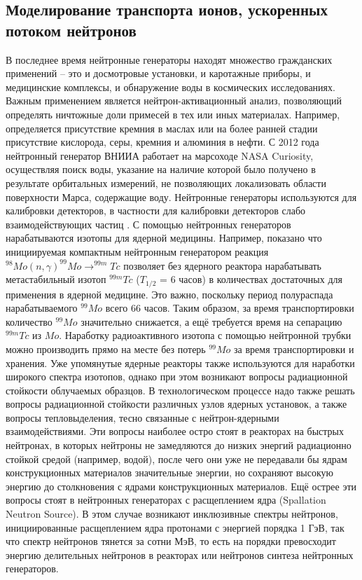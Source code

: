 \documentclass[a4paper,12pt]{article}
\begin{document}
\begin{large}
  
  
  
  
  



   
   
   
\clearpage
\section{Моделирование транспорта ионов, ускоренных потоком нейтронов}
\label{Sol}

   В последнее время нейтронные генераторы находят множество гражданских применений -- это и досмотровые установки, и каротажные приборы, и медицинские комплексы, и обнаружение воды в космических исследованиях.
   Важным применением является нейтрон-активационный анализ, позволяющий определять ничтожные доли примесей в тех или иных материалах.
   Например, определяется присутствие кремния в маслах или на более ранней стадии присутствие кислорода, серы, кремния и алюминия в нефти.
   С 2012 года нейтронный генератор ВНИИА работает на марсоходе NASA Curiosity, осуществляя поиск воды, указание на наличие которой было получено в результате орбитальных измерений, не позволяющих локализовать области поверхности Марса, содержащие воду.
   Нейтронные генераторы используются для калибровки детекторов, в частности для калибровки детекторов слабо взаимодействующих частиц \cite{Calibr}.
   С помощью нейтронных генераторов нарабатываются изотопы для ядерной медицины.
   Например, показано что инициируемая компактным нейтронным генератором реакция $^{98}Mo(n,\gamma)^{99}Mo\rightarrow^{99m}Tc$ позволяет без ядерного реактора нарабатывать метастабильный изотоп $^{99m}Tc$ ($T_{1/2}$ = 6 часов) в количествах достаточных для применения в ядерной медицине.
   Это важно, поскольку период полураспада нарабатываемого $^{99}Mo$ всего 66 часов.
   Таким образом, за время транспортировки количество $^{99}Mo$ значительно снижается, а ещё требуется время на сепарацию $^{99m}Tc$ из $Mo$.
   Наработку радиоактивного изотопа с помощью нейтронной трубки можно производить прямо на месте без потерь $^{99}Mo$ за время транспортировки и хранения.
   Уже упомянутые ядерные реакторы также используются для наработки широкого спектра изотопов, однако при этом возникают вопросы радиационной стойкости облучаемых образцов.
   В технологическом процессе надо также решать вопросы радиационной стойкости различных узлов ядерных установок, а также вопросы тепловыделения, тесно связанные с нейтрон-ядерными взаимодействиями.
   Эти вопросы наиболее остро стоят в реакторах на быстрых нейтронах, в которых нейтроны не замедляются до низких энергий радиационно стойкой средой (например, водой), после чего они уже не передавали бы ядрам конструкционных материалов значительные энергии, но сохраняют высокую энергию до столкновения с ядрами конструкционных материалов.
   Ещё острее эти вопросы стоят в нейтронных генераторах с расщеплением ядра (Spallation Neutron Source).
   В этом случае возникают инклюзивные спектры нейтронов, инициированные расщеплением ядра протонами с энергией порядка 1 ГэВ, так что спектр нейтронов тянется за сотни МэВ, то есть на порядки превосходит энергию делительных нейтронов в реакторах или нейтронов синтеза нейтронных генераторов.


\end{large}
\end{document}
